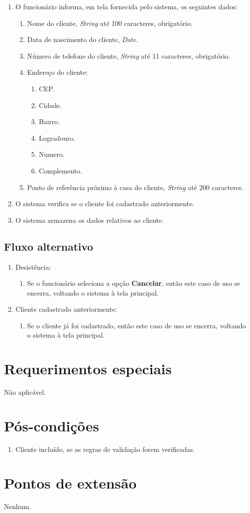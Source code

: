 \begin{enumerate}
	\item O funcionário informa, em tela fornecida pelo sistema, os seguintes dados:
	\begin{enumerate}
		\item Nome do cliente, \emph{String} até 100 caracteres, obrigatório.
		\item Data de nascimento do cliente, \emph{Date}.
		\item Número de telefone do cliente, \emph{String} até 11 caracteres, obrigatório.
		\item Endereço do cliente:
		\begin{enumerate}
			\item CEP.
			\item Cidade.
			\item Bairro.
			\item Logradouro.
			\item Numero.
			\item Complemento.
		\end{enumerate}
		\item Ponto de referência próximo à casa do cliente, \emph{String} até 200 caracteres.
	\end{enumerate}
	\item O sistema verifica se o cliente foi cadastrado anteriormente.
	\item O sistema armazena os dados relativos ao cliente.
\end{enumerate}

\subsection{Fluxo alternativo}

\begin{enumerate}
	\item Desistência:
	\begin{enumerate}
		\item Se o funcionário seleciona a opção \textbf{Cancelar}, então este caso de uso se encerra, voltando o sistema à tela principal.
	\end{enumerate}
	\item Cliente cadastrado anteriormente:
	\begin{enumerate}
		\item Se o cliente já foi cadastrado, então este caso de uso se encerra, voltando o
		sistema à tela principal.
	\end{enumerate}
\end{enumerate}

\section{Requerimentos especiais}

Não aplicável.

\section{Pós-condições}

\begin{enumerate}
	\item Cliente incluído, se as regras de validação forem verificadas.
\end{enumerate}

\section{Pontos de extensão}

Nenhum.